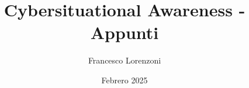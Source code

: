 


\title{Cybersituational Awareness - Appunti}
\author{Francesco Lorenzoni}
\date{Febrero 2025}


\makeatletter
\renewcommand{\l@section}{\@dottedtocline{1}{1.5em}{2.6em}}
\renewcommand{\l@subsection}{\@dottedtocline{2}{2.5em}{3.6em}}
\renewcommand{\l@subsubsection}{\@dottedtocline{3}{3.5em}{4.5em}}
\makeatother
{} %

% 
\usepackage{enumitem}


\doparttoc[n]

\maketitle
\tableofcontents


% 
% 
% 
% 
% 
% 


